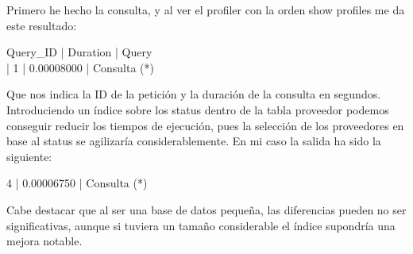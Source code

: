 \documentclass[a4paper, 11pt]{article} %
\begin{document}
Primero he hecho la consulta, y al ver el profiler con la orden show profiles me da este resultado: 

 Query\_ID | Duration   | Query \\
 |        1 | 0.00008000 | Consulta (*)
 
Que nos indica la ID de la petición y la duración de la consulta en segundos. Introduciendo un índice sobre los status dentro de la tabla proveedor podemos conseguir reducir los tiempos de ejecución, pues la selección de los proveedores en base al status se agilizaría considerablemente. En mi caso la salida ha sido la siguiente: 

 4 | 0.00006750 | Consulta (*)

Cabe destacar que al ser una base de datos pequeña, las diferencias pueden no ser significativas, aunque si tuviera un tamaño considerable el índice supondría una mejora notable. 
\end{document}

